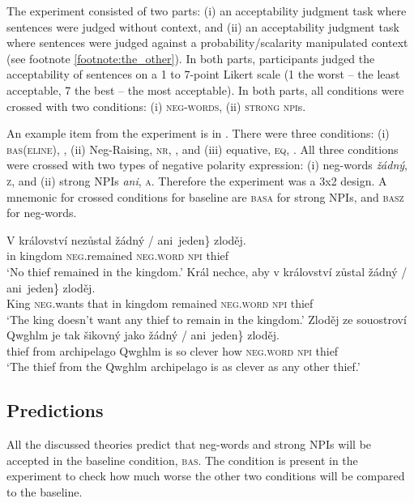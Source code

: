 \documentclass[output=paper,colorlinks,citecolor=brown]{langscibook}
\begin{document}
The experiment consisted of two parts: (i) an acceptability judgment task where sentences were judged without context, and (ii) an acceptability judgment task where sentences were judged against a probability/scalarity manipulated context (see footnote \ref{footnote:the_other}). In both parts, participants judged the acceptability of sentences on a 1 to 7-point Likert scale (1 the worst -- the least acceptable, 7 the best -- the most acceptable). In both parts, all conditions were crossed with two conditions: (i) \textsc{neg-words}, (ii) \textsc{strong npi}s. 

An example item from the experiment is in . There were three conditions: (i) \textsc{bas(eline)}, , (ii) Neg-Raising, \textsc{nr}, , and (iii) equative, \textsc{eq}, . All three conditions were crossed with two types of negative polarity expression: (i) neg-words \textit{žádný}, \textsc{z}, and (ii) strong NPIs \textit{ani}, \textsc{a}. Therefore the experiment was a 3x2 design. A mnemonic for crossed conditions for baseline are \textsc{basa} for strong NPIs, and \textsc{basz} for neg-words.

\ea\label{ex-8} \ea\label{ex-8-a} \gll V království nezůstal \minsp{\{} žádný / ani~jeden\} zloděj.\\
in kingdom \textsc{neg}.remained {} \textsc{neg.word} {} \textsc{npi} thief\\
\glt `No thief remained in the kingdom.' 
\ex\label{ex-8-b} \gll Král nechce, aby v království zůstal \minsp{\{} žádný / ani~jeden\} zloděj.\\
King \textsc{neg}.wants that in kingdom remained {} \textsc{neg.word} {} \textsc{npi} thief\\
\glt `The king doesn't want any thief to remain in the kingdom.' 
\ex\label{ex-8-c} \gll Zloděj ze souostroví Qwghlm je tak šikovný jako \minsp{\{} žádný / ani~jeden\} zloděj.\\
thief from archipelago Qwghlm is so clever how {} \textsc{neg.word} {} \textsc{npi} thief\\
\glt `The thief from the Qwghlm archipelago is as clever as any other thief.'
\z\z

\subsection{Predictions}

All the discussed theories predict that neg-words and strong NPIs will be accepted in the baseline condition, \textsc{bas}. The condition is present in the experiment to check how much worse the other two conditions will be compared to the baseline. 
\end{document}
